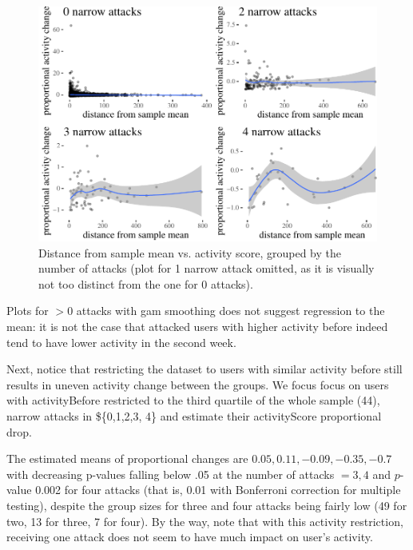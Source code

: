 \documentclass[10pt,dvipsnames]{scrartcl}
\begin{document}
\begin{figure}[H]

\begin{center}\includegraphics[width=1\linewidth]{quittingShortAbridgedRevisions2_files/figure-latex/unnamed-chunk-61-1} \end{center}
\caption{Distance from sample mean vs. activity score, grouped by the number of attacks (plot for 1 narrow attack omitted, as it is visually not too distinct from the one for 0 attacks).}
\label{fig:regression2}
\end{figure}

Plots for \(>0\) attacks with gam smoothing does not suggest regression
to the mean: it is not the case that attacked users with higher activity
before indeed tend to have lower activity in the second week.

Next, notice that restricting the dataset to users with similar activity
before still results in uneven activity change between the groups. We
focus focus on users with \textsf{activityBefore} restricted to the
third quartile of the whole sample (44), narrow attacks in \$\{0,1,2,3,
4\} and estimate their \textsf{activityScore} proportional drop.

\normalsize  The estimated means of proportional changes are
\(0.05, 0.11, -0.09,-0.35, -0.7\) with decreasing p-values falling below
.05 at the number of attacks \(=3, 4\) and \(p\)-value 0.002 for four
attacks (that is, 0.01 with Bonferroni correction for multiple testing),
despite the group sizes for three and four attacks being fairly low (49
for two, 13 for three, 7 for four). By the way, note that with this
activity restriction, receiving one attack does not seem to have much
impact on user's activity.
\end{document}
